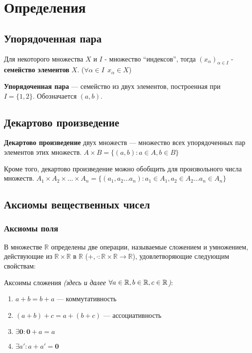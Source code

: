 

\usepackage{bm}
\usepackage{xcolor}
\usepackage{sectsty}

\allsectionsfont{\raggedright}
\subsectionfont{\fontsize{14}{15}\selectfont}

\cfoot{}
\rfoot{}

\setlength\parindent{0pt}


\section{Определения}
\subsection{Упорядоченная пара}
Для некоторого множества $X$ и $I$ - множество ``индексов'', тогда $(x_\alpha)_{\alpha\in I}$ - \textbf{семейство элементов} $X$. ($\forall \alpha\in I \ \ x_\alpha \in X$)

\textbf{Упорядоченная пара} --- семейство из двух элементов, построенная при $I=\{1, 2\}$. Обозначается $(a, b)$.
\subsection{Декартово произведение}
\textbf{Декартово произведение} двух множеств --- множество всех упорядоченных пар элементов этих множеств. $A\times B=\{(a,b): a\in A, b\in B\}$

Кроме того, декартово произведение можно обобщить для произвольного числа множеств. $A_1\times A_2\times\ldots\times A_n = \{(a_1,a_2\ldots a_n) : a_1\in A_1, a_2\in A_2\ldots a_n\in A_n\}$

\subsection{Аксиомы вещественных чисел}
\subsubsection{Аксиомы поля}
В множестве $\mathbb{R}$ определены две операции, называемые сложением и умножением, действующие из $\mathbb{R}\times\mathbb{R}$ в $\mathbb{R}$ ($+,\cdot:\mathbb{R}\times\mathbb{R} \rightarrow \mathbb{R}$), удовлетворяющие следующим свойствам:

Аксоимы сложения \textit{(здесь и далее $\forall a\in \operatorname*{\mathbb{R}}, b\in \operatorname*{\mathbb{R}}, c\in \operatorname*{\mathbb{R}}$)}:
\begin{enumerate}
    \itemsep0em
    \item $a+b=b+a$ --- коммутативность
    \item $(a+b)+c=a+(b+c)$ --- ассоциативность
    \item $\exists \bm{0}: \bm0+a=a$
    \item $\exists a': a+a'=\bm 0$
\end{enumerate}


